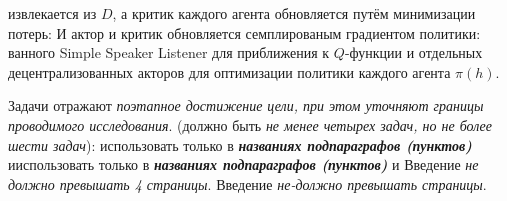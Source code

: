 извлекается из $D$, а критик каждого агента обновляется путём минимизации потерь:
И актор и критик обновляется семплированым градиентом политики:
ванного Simple Speaker Listener для приближения к $Q$-функции и отдельных децентрализованных акторов для оптимизации политики каждого агента $\pi (h)$. \cite{foerster2017counterfactual}

Задачи отражают \textit{поэтапное достижение цели, при этом уточняют границы проводимого исследования}.
 (должно быть \textit{не менее четырех задач, но не более шести задач}):
использовать только в \textbf{\textit{названиях подпараграфов (пунктов)}} ииспользовать только в \textbf{\textit{названиях подпараграфов (пунктов)}} и
Введение \textit{не должно превышать 4 страницы}.
Введение \textit{не-должно превышать страницы}.
